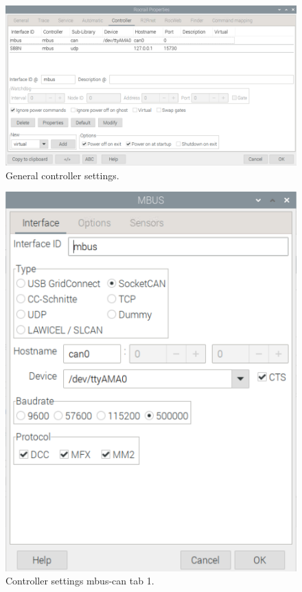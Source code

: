 \begin{figure}[h!]
	\centering
	\includegraphics[width=1.00\linewidth]{../figures/rocrailcontrollersettings/generalcontrollersettings.png}
	\caption{General controller settings.}
	\label{fig:generalcontrollersettings}
\end{figure}

\begin{figure}[h!]
	\centering
	\includegraphics[width=1.00\linewidth]{../figures/rocrailcontrollersettings/mbus_settings_tab1.png}
	\caption{Controller settings mbus-can tab 1.}
	\label{fig:mbus_settings_tab1}
\end{figure}

